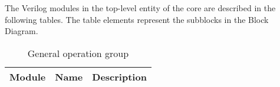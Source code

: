 The Verilog modules in the top-level entity of the core are         described in the following tables. The table elements represent         the subblocks in the Block Diagram.

\begin{table}[H]
  \centering
  \begin{tabularx}{\textwidth}{|l|l|X|}

    \hline
    \rowcolor{iob-green}
    {\bf Module} & {\bf Name} & {\bf Description}  \\ \hline \hline

    

  \end{tabularx}
  \caption{General operation group}
  \label{general_operation_subblocks_tab:is}
\end{table}
\clearpage